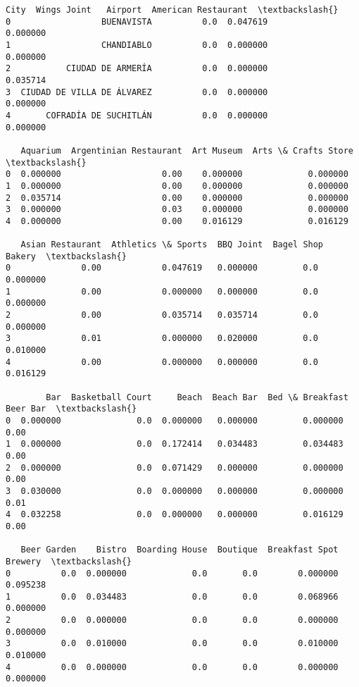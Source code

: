 \documentclass[11pt]{article}
\makeatletter
\newcommand{\boxspacing}{\kern\kvtcb@left@rule\kern\kvtcb@boxsep}
\newcommand{\prompt}[4]{
        \ttfamily\llap{{\color{#2}[#3]:\hspace{3pt}#4}}\vspace{-\baselineskip}
    }
\makeatother
\begin{document}
            \begin{tcolorbox}[breakable, size=fbox, boxrule=.5pt, pad at break*=1mm, opacityfill=0]
\prompt{Out}{outcolor}{32}{\boxspacing}
\begin{Verbatim}[commandchars=\\\{\}]
                         City  Wings Joint   Airport  American Restaurant  \textbackslash{}
0                  BUENAVISTA          0.0  0.047619             0.000000
1                  CHANDIABLO          0.0  0.000000             0.000000
2           CIUDAD DE ARMERÍA          0.0  0.000000             0.035714
3  CIUDAD DE VILLA DE ÁLVAREZ          0.0  0.000000             0.000000
4       COFRADÍA DE SUCHITLÁN          0.0  0.000000             0.000000

   Aquarium  Argentinian Restaurant  Art Museum  Arts \& Crafts Store  \textbackslash{}
0  0.000000                    0.00    0.000000             0.000000
1  0.000000                    0.00    0.000000             0.000000
2  0.035714                    0.00    0.000000             0.000000
3  0.000000                    0.03    0.000000             0.000000
4  0.000000                    0.00    0.016129             0.016129

   Asian Restaurant  Athletics \& Sports  BBQ Joint  Bagel Shop    Bakery  \textbackslash{}
0              0.00            0.047619   0.000000         0.0  0.000000
1              0.00            0.000000   0.000000         0.0  0.000000
2              0.00            0.035714   0.035714         0.0  0.000000
3              0.01            0.000000   0.020000         0.0  0.010000
4              0.00            0.000000   0.000000         0.0  0.016129

        Bar  Basketball Court     Beach  Beach Bar  Bed \& Breakfast  Beer Bar  \textbackslash{}
0  0.000000               0.0  0.000000   0.000000         0.000000      0.00
1  0.000000               0.0  0.172414   0.034483         0.034483      0.00
2  0.000000               0.0  0.071429   0.000000         0.000000      0.00
3  0.030000               0.0  0.000000   0.000000         0.000000      0.01
4  0.032258               0.0  0.000000   0.000000         0.016129      0.00

   Beer Garden    Bistro  Boarding House  Boutique  Breakfast Spot   Brewery  \textbackslash{}
0          0.0  0.000000             0.0       0.0        0.000000  0.095238
1          0.0  0.034483             0.0       0.0        0.068966  0.000000
2          0.0  0.000000             0.0       0.0        0.000000  0.000000
3          0.0  0.010000             0.0       0.0        0.010000  0.010000
4          0.0  0.000000             0.0       0.0        0.000000  0.000000


\end{Verbatim}
\end{tcolorbox}
\end{document}
